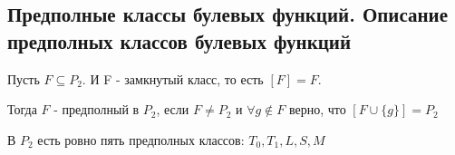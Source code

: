 \subsection{Предполные классы булевых функций. Описание предполных классов булевых функций}

Пусть $F \subseteq P_2$. И F - замкнутый класс, то есть $[F] = F$.

Тогда $F$ - предполный в $P_2$, если $F \neq P_2$ и $\forall g \notin F$ верно, что $[F \cup \{g\}] = P_2$

В $P_2$ есть ровно пять предполных классов: $T_0, T_1, L, S, M$